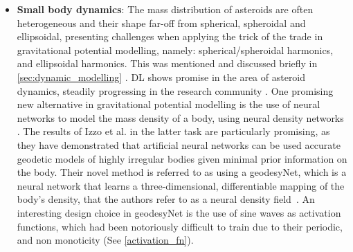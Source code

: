 \begin{itemize}
    \item \textbf{Small body dynamics}: The mass distribution of asteroids are
           often heterogeneous and their shape far-off from spherical,
           spheroidal and ellipsoidal, presenting challenges when applying the
           trick of the trade in gravitational potential modelling, namely:
           spherical/spheroidal harmonics, and ellipsoidal harmonics. This
           was mentioned and discussed briefly in \autoref{sec:dynamic_modelling}
           \textcolor{(section on environment models)}. \gls{DL} shows promise
           in the area of asteroid dynamics, steadily progressing in the
           research community \cite{carruba2022machine}. One promising new
           alternative in gravitational potential modelling is the use of
           neural networks to model the mass density of a body, using neural
           density networks \cite{DBLP:journals/corr/abs-1802-00121}. The
           results of Izzo et al. in the latter task are particularly promising,
           as they have demonstrated that artificial neural networks can be used
           accurate geodetic models of highly irregular bodies given minimal
           prior information on the body. Their novel method is referred to as
           using a geodesyNet, which is a neural network that learns a
           three-dimensional, differentiable mapping of the body's density, that
           the authors refer to as a neural density
           field~\cite{IzzoGeodesyNet2021}. An interesting design choice in
           geodesyNet is the use of sine waves as activation functions, which
           had been notoriously difficult to train due to their periodic, and
           non monoticity (See \autoref{activation_fn}).

%

%


\end{itemize}
